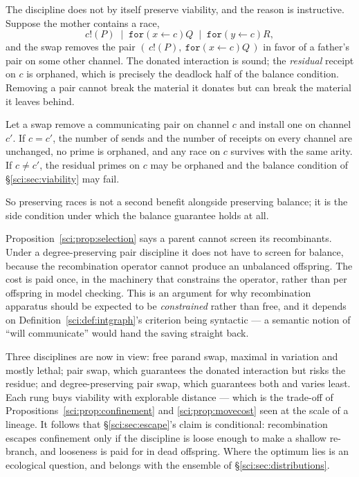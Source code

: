 The discipline does not by itself preserve viability, and the reason is instructive. Suppose the
mother contains a race,
\[
c!(P) \;\mid\; \texttt{for}(x \leftarrow c)Q \;\mid\; \texttt{for}(y \leftarrow c)R ,
\]
and the swap removes the pair $(\,c!(P),\ \texttt{for}(x \leftarrow c)Q\,)$ in favor of a father's
pair on some other channel. The donated interaction is sound; the \emph{residual} receipt on $c$ is
orphaned, which is precisely the deadlock half of the balance condition. Removing a pair cannot break
the material it donates but can break the material it leaves behind.

\begin{proposition}
\label{sci:prop:degree}
Let a swap remove a communicating pair on channel $c$ and install one on channel $c'$. If $c = c'$,
the number of sends and the number of receipts on every channel are unchanged, no prime is orphaned,
and any race on $c$ survives with the same arity. If $c \ne c'$, the residual primes on $c$ may be
orphaned and the balance condition of \S\ref{sci:sec:viability} may fail.
\end{proposition}

So preserving races is not a second benefit alongside preserving balance; it is the side condition
under which the balance guarantee holds at all.

\begin{remark}
\label{sci:rem:discipline}
Proposition~\ref{sci:prop:selection} says a parent cannot screen its recombinants. Under a
degree-preserving pair discipline it does not have to screen for balance, because the recombination
operator cannot produce an unbalanced offspring. The cost is paid once, in the machinery that
constrains the operator, rather than per offspring in model checking. This is an argument for why
recombination apparatus should be expected to be \emph{constrained} rather than free, and it depends
on Definition~\ref{sci:def:intgraph}'s criterion being syntactic --- a semantic notion of ``will
communicate'' would hand the saving straight back.
\end{remark}

\begin{remark}
\label{sci:rem:dial}
Three disciplines are now in view: free parand swap, maximal in variation and mostly lethal; pair
swap, which guarantees the donated interaction but risks the residue; and degree-preserving pair swap,
which guarantees both and varies least. Each rung buys viability with explorable distance --- which is
the trade-off of Propositions~\ref{sci:prop:confinement} and \ref{sci:prop:movecost} seen at the scale of a
lineage. It follows that \S\ref{sci:sec:escape}'s claim is conditional: recombination escapes confinement
only if the discipline is loose enough to make a shallow re-branch, and looseness is paid for in dead
offspring. Where the optimum lies is an ecological question, and belongs with the ensemble of
\S\ref{sci:sec:distributions}.
\end{remark}

